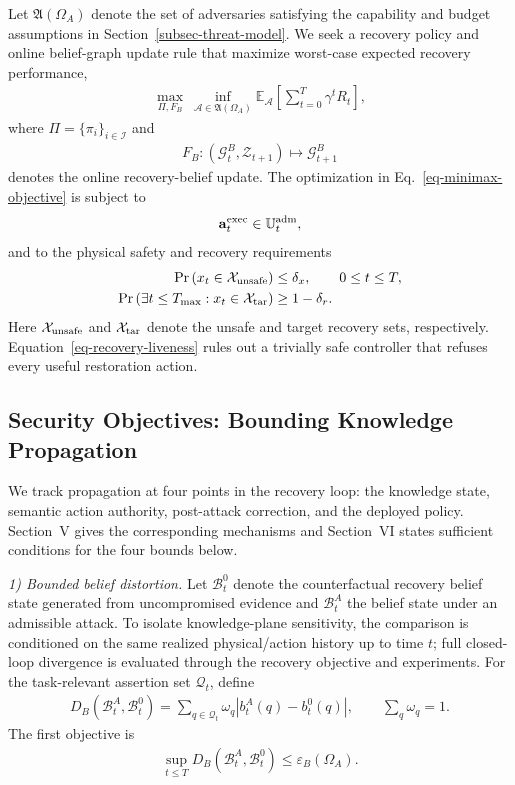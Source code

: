Let $\mathfrak{A}(\Omega_A)$ denote the set of adversaries satisfying the capability and budget assumptions in Section~\ref{subsec-threat-model}. We seek a recovery policy and online belief-graph update rule that maximize worst-case expected recovery performance,
\begin{align}
\label{eq-minimax-objective}
\max_{\Pi,F_B}\ \inf_{\mathscr{A}\in\mathfrak{A}(\Omega_A)}
\mathbb{E}_{\mathscr{A}}
\left[\sum_{t=0}^{T}\gamma^t R_t\right],
\end{align}
where $\Pi=\{\pi_i\}_{i\in\mathcal{I}}$ and
\begin{align}
\label{eq-belief-update-map}
F_B:(\mathcal G_t^B,\mathcal Z_{t+1})\mapsto\mathcal G_{t+1}^B
\end{align}
denotes the online recovery-belief update. The optimization in Eq.~\ref{eq-minimax-objective} is subject to
\begin{align}
\label{eq-execution-constraint}
\mathbf{a}^{\rm exec}_t\in\mathbb{U}^{\rm adm}_t,
\end{align}
and to the physical safety and recovery requirements
\begin{align}
\label{eq-safety-probability}
\Pr\left(x_t\in\mathcal{X}_{\rm unsafe}\right)&\le\delta_x,
\qquad 0\le t\le T,\\
\label{eq-recovery-liveness}
\Pr\left(\exists t\le T_{\max}:x_t\in\mathcal{X}_{\rm tar}\right)&\ge1-\delta_r.
\end{align}
Here $\mathcal{X}_{\rm unsafe}$ and $\mathcal{X}_{\rm tar}$ denote the unsafe and target recovery sets, respectively. Equation~\ref{eq-recovery-liveness} rules out a trivially safe controller that refuses every useful restoration action.

\subsection{Security Objectives: Bounding Knowledge Propagation}
\label{subsec-security-objectives}
We track propagation at four points in the recovery loop: the knowledge state, semantic action authority, post-attack correction, and the deployed policy. Section~V gives the corresponding mechanisms and Section~VI states sufficient conditions for the four bounds below.

\emph{1) Bounded belief distortion.}
Let $\mathcal{B}^{0}_t$ denote the counterfactual recovery belief state generated from uncompromised evidence and $\mathcal{B}^{A}_t$ the belief state under an admissible attack. To isolate knowledge-plane sensitivity, the comparison is conditioned on the same realized physical/action history up to time $t$; full closed-loop divergence is evaluated through the recovery objective and experiments. For the task-relevant assertion set $\mathcal{Q}_t$, define
\begin{align}
\label{eq-belief-distance}
D_B(\mathcal{B}^{A}_t,\mathcal{B}^{0}_t)
=\sum_{q\in\mathcal{Q}_t}\omega_q
\left|b^{A}_t(q)-b^{0}_t(q)\right|,
\qquad \sum_q\omega_q=1.
\end{align}
The first objective is
\begin{align}
\label{eq-bounded-belief-distortion}
\sup_{t\le T}
D_B(\mathcal{B}^{A}_t,\mathcal{B}^{0}_t)
\le \varepsilon_B(\Omega_A).
\end{align}

